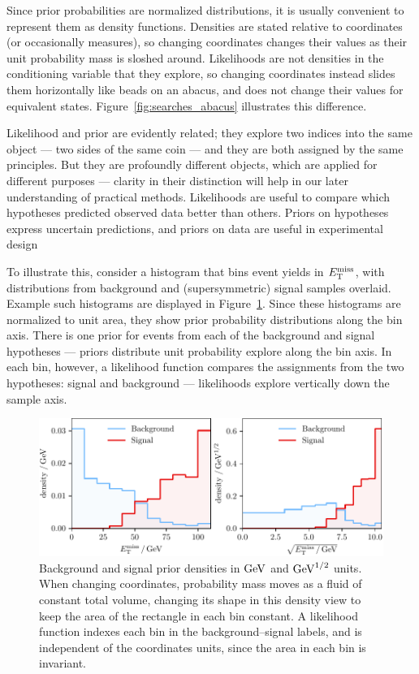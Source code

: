 Since prior probabilities are normalized distributions, it is usually
convenient to represent them as density functions.
Densities are stated relative to coordinates (or occasionally measures),
so changing coordinates changes their values as their unit probability mass
is sloshed around.
Likelihoods are not densities in the conditioning variable that they explore,
so changing coordinates instead slides them horizontally like beads on an
abacus, and does not change their values for equivalent states.
Figure~\ref{fig:searches_abacus} illustrates this difference.

Likelihood and prior are evidently related; they explore two indices into
the same object --- two sides of the same coin --- and they are both assigned
by the same principles.
But they are profoundly different objects, which are applied for different
purposes ---
clarity in their distinction will help in our later understanding of
practical methods.
Likelihoods are useful to compare which hypotheses predicted observed data
better than others.
Priors on hypotheses express uncertain predictions, and
priors on data are useful in experimental design

To illustrate this, consider a histogram that bins event yields in
$\met$, with distributions from background and (supersymmetric) signal samples
overlaid.
Example such histograms are displayed in
Figure~\ref{fig:searches_sig_bkg_prior_likelihood}.
Since these histograms are normalized to unit area, they show prior
probability distributions along the bin axis.
There is one prior for events from each of the background and signal
hypotheses ---
priors distribute unit probability explore along the bin axis.
In each bin, however, a likelihood function compares the assignments from
the two hypotheses: signal and background ---
likelihoods explore vertically down the sample axis.

\begin{figure}[tp]
\centering
\includegraphics[width=\textwidth]{figures/searches_sig_bkg_prior_likelihood.pdf}
\caption[
Background and signal prior densities
]{%
Background and signal prior densities in $\eV[G]$ and $\eV[G]^{1/2}$ units.
When changing coordinates, probability mass moves as a fluid of constant total
volume, changing its shape in this density view to keep the area of the
rectangle in each bin constant.
A likelihood function indexes each bin in the background--signal labels,
and is independent of the coordinates units, since the area in each bin is
invariant.
}
\label{fig:searches_sig_bkg_prior_likelihood}
\end{figure}

